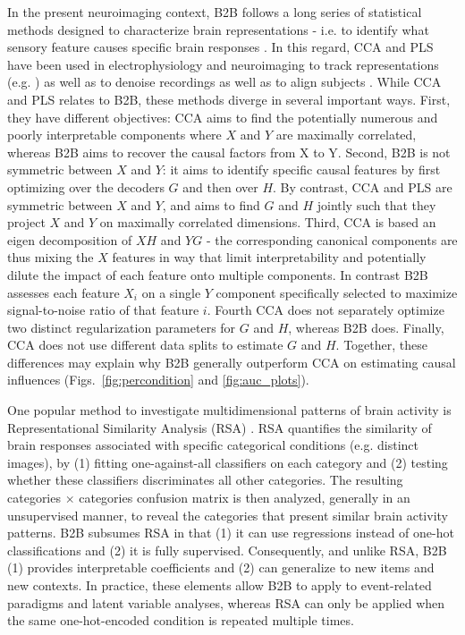 \documentclass[preprint,12pt,3p]{elsarticle}
\begin{document}
In the present neuroimaging context, B2B follows a long series of statistical
methods designed to characterize brain representations - i.e. to identify what
sensory feature causes specific brain responses \citep{naselaris2011encoding}.
In this regard, CCA and PLS have been used in electrophysiology and neuroimaging
to track representations (e.g. \citep{musch2020transformation}) as well as
to denoise recordings as well as to align subjects \citep{cca_hotelling, de2019multiway}. While
CCA and PLS relates to B2B, these methods diverge in several important ways.
First, they have different objectives: CCA aims to find the potentially numerous and poorly
interpretable components where $X$ and $Y$ are maximally correlated, whereas B2B
aims to recover the causal factors from X to Y. Second, B2B is not symmetric
between $X$ and $Y$: it aims to identify specific causal features by first
optimizing over the decoders $G$ and then over $H$. By contrast, CCA and PLS are
symmetric between $X$ and $Y$, and aims to find $G$ and $H$ jointly such that they
project $X$ and $Y$ on maximally correlated dimensions. Third, CCA is based an
eigen decomposition of $XH$ and $YG$ - the corresponding canonical components
are thus mixing the $X$ features in way that limit interpretability and
potentially dilute the impact of each feature onto multiple components. In
contrast B2B assesses each feature $X_i$ on a single $Y$ component specifically
selected to maximize signal-to-noise ratio of that feature $i$. Fourth CCA does
not separately optimize two distinct regularization parameters for $G$ and $H$,
whereas B2B does. Finally, CCA does not use different data splits to
estimate $G$ and $H$. Together, these differences may explain why B2B generally
outperform CCA on estimating causal influences (Figs.~\ref{fig:percondition} and
\ref{fig:auc_plots}).

One popular method to investigate multidimensional patterns of brain activity is
Representational Similarity Analysis (RSA)
\citep{kriegeskorte2008representational}. RSA quantifies the
similarity of brain responses associated with specific categorical conditions
(e.g. distinct images), by (1) fitting one-against-all classifiers on each
category and (2) testing whether these classifiers discriminates all other
categories. The resulting categories $\times$ categories confusion matrix is
then analyzed, generally in an unsupervised manner, to reveal the categories
that present similar brain activity patterns. B2B
subsumes RSA in that (1) it can use regressions instead of one-hot
classifications and (2) it is fully supervised.
Consequently, and unlike RSA, B2B (1) provides interpretable coefficients and
(2) can generalize to new items and new contexts. In practice, these elements
allow B2B to apply to event-related paradigms and latent variable analyses,
whereas RSA can only be applied when the same one-hot-encoded condition is
repeated multiple times.
\end{document}
